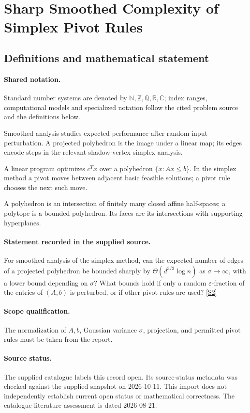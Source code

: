 \documentclass[11pt]{article}
\newcommand{\sref}[2]{\hyperlink{source:#1:#2}{[S#2]}}
\begin{document}
\section{Sharp Smoothed Complexity of Simplex Pivot Rules}\label{statement}

\subsection{Definitions and mathematical statement}

\paragraph{Shared notation.}Standard number systems are denoted by $\mathbb N,\mathbb Z,\mathbb Q,\mathbb R,\mathbb C$; index ranges, computational models and specialized notation follow the cited problem source and the definitions below.


Smoothed analysis studies expected performance after random input perturbation. A projected polyhedron is the image under a linear map; its edges encode steps in the relevant shadow-vertex simplex analysis.

A linear program optimizes $c^Tx$ over a polyhedron $\{x:Ax\leq b\}$. In the simplex method a pivot moves between adjacent basic feasible solutions; a pivot rule chooses the next such move.

A polyhedron is an intersection of finitely many closed affine half-spaces; a polytope is a bounded polyhedron. Its faces are its intersections with supporting hyperplanes.
\paragraph{Statement recorded in the supplied source.}
For smoothed analysis of the simplex method, can the expected number of edges of a projected polyhedron be bounded sharply by $\Theta(d^{3/2}\log n)$ as $\sigma\to\infty$, with a lower bound depending on $\sigma$? What bounds hold if only a random $\varepsilon$-fraction of the entries of $(A,b)$ is perturbed, or if other pivot rules are used? \sref{statement}{2}
\paragraph{Scope qualification.}
The normalization of $A,b$, Gaussian variance $\sigma$, projection, and permitted pivot rules must be taken from the report.
\paragraph{Source status.}
The supplied catalogue labels this record open. Its source-status metadata was checked against the supplied snapshot on 2026-10-11. This import does not independently establish current open status or mathematical correctness. The catalogue literature assessment is dated 2026-08-21.
\end{document}

